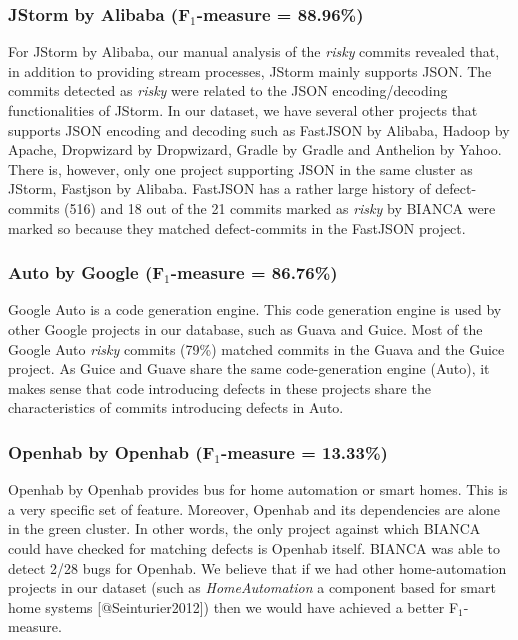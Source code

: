 \subsubsection{\texorpdfstring{JStorm by Alibaba (F\(_1\)-measure =
88.96\%)}{JStorm by Alibaba (F\_1-measure = 88.96\%)}}\label{jstorm-by-alibaba-f_1-measure-88.96}

For JStorm by Alibaba, our manual analysis of the \emph{risky} commits
revealed that, in addition to providing stream processes, JStorm mainly
supports JSON. The commits detected as \emph{risky} were related to the
JSON encoding/decoding functionalities of JStorm. In our dataset, we
have several other projects that supports JSON encoding and decoding
such as FastJSON by Alibaba, Hadoop by Apache, Dropwizard by Dropwizard,
Gradle by Gradle and Anthelion by Yahoo. There is, however, only one
project supporting JSON in the same cluster as JStorm, Fastjson by
Alibaba. FastJSON has a rather large history of defect-commits (516) and
18 out of the 21 commits marked as \emph{risky} by BIANCA were marked so
because they matched defect-commits in the FastJSON project.

\subsubsection{\texorpdfstring{Auto by Google (F\(_1\)-measure =
86.76\%)}{Auto by Google (F\_1-measure = 86.76\%)}}\label{auto-by-google-f_1-measure-86.76}

Google Auto is a code generation engine. This code generation engine is
used by other Google projects in our database, such as Guava and Guice.
Most of the Google Auto \emph{risky} commits (79\%) matched commits in
the Guava and the Guice project. As Guice and Guave share the same
code-generation engine (Auto), it makes sense that code introducing
defects in these projects share the characteristics of commits
introducing defects in Auto.

\subsubsection{\texorpdfstring{Openhab by Openhab (F\(_1\)-measure =
13.33\%)}{Openhab by Openhab (F\_1-measure = 13.33\%)}}\label{openhab-by-openhab-f_1-measure-13.33}

Openhab by Openhab provides bus for home automation or smart homes. This
is a very specific set of feature. Moreover, Openhab and its
dependencies are alone in the green cluster. In other words, the only
project against which BIANCA could have checked for matching defects is
Openhab itself. BIANCA was able to detect 2/28 bugs for Openhab. We
believe that if we had other home-automation projects in our dataset
(such as \emph{HomeAutomation} a component based for smart home systems
{[}@Seinturier2012{]}) then we would have achieved a better
F\(_1\)-measure.


